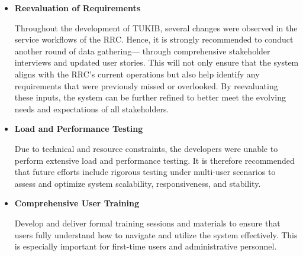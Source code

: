 \begin{itemize}
	
	\item \textbf {Reevaluation of Requirements}
	
	Throughout the development of TUKIB, several changes were observed in the service workflows of the RRC. Hence, it is strongly recommended to conduct another round of data gathering— through comprehensive stakeholder interviews and updated user stories. This will not only ensure that the system aligns with the RRC’s current operations but also help identify any requirements that were previously missed or overlooked. By reevaluating these inputs, the system can be further refined to better meet the evolving needs and expectations of all stakeholders.
	
	\item \textbf{Load and Performance Testing}
	
	Due to technical and resource constraints, the developers were unable to perform extensive load and performance testing. It is therefore recommended that future efforts include rigorous testing under multi-user scenarios to assess and optimize system scalability, responsiveness, and stability.
	
	\item \textbf{Comprehensive User Training}
	
	Develop and deliver formal training sessions and materials to ensure that users fully understand how to navigate and utilize the system effectively. This is especially important for first-time users and administrative personnel.
	
\end{itemize}